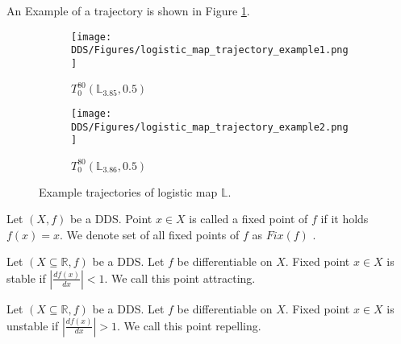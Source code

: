\begin{remark}
    An Example of a trajectory is shown in Figure \ref{fig:trajectory_example}.
\end{remark}


\begin{figure}[!h]
    \centering
    \begin{subfigure}{0.495\textwidth}
        \centering
        \texttt{[image: DDS/Figures/logistic\_map\_trajectory\_example1.png]}
        \caption{$T_{0}^{80}(\mathbb{L}_{3.85} ,0.5)$}
    \end{subfigure}
    \hfill
    \begin{subfigure}{0.495\textwidth}
        \centering
        \texttt{[image: DDS/Figures/logistic\_map\_trajectory\_example2.png]}
        \caption{$T_{0}^{80}(\mathbb{L}_{3.86} ,0.5)$}
    \end{subfigure}

    \caption{Example trajectories of logistic map $\mathbb{L}$.}
    \label{fig:trajectory_example}
\end{figure}

\label{def:fixed point}
\begin{definition}
    Let $(X, f)$ be a DDS. Point $x \in X$ is called a fixed point of $f$ if it holds $f(x) = x$.
    We denote set of all fixed points of $f$ as $Fix(f)$ \cite{Devaney20211026}.
\end{definition}

\begin{definition}
    Let $(X \subseteq \mathbb{R}, f)$ be a DDS. Let $f$ be differentiable on $X$. Fixed point $x \in X$ is stable if $|\frac{d{f(x)}}{dx}| < 1$.
    We call this point attracting.
\end{definition}

\begin{definition}
    Let $(X \subseteq \mathbb{R}, f)$ be a DDS. Let $f$ be differentiable on $X$. Fixed point $x \in X$ is unstable if $|\frac{d{f(x)}}{dx}| > 1$.
    We call this point repelling.
\end{definition}

